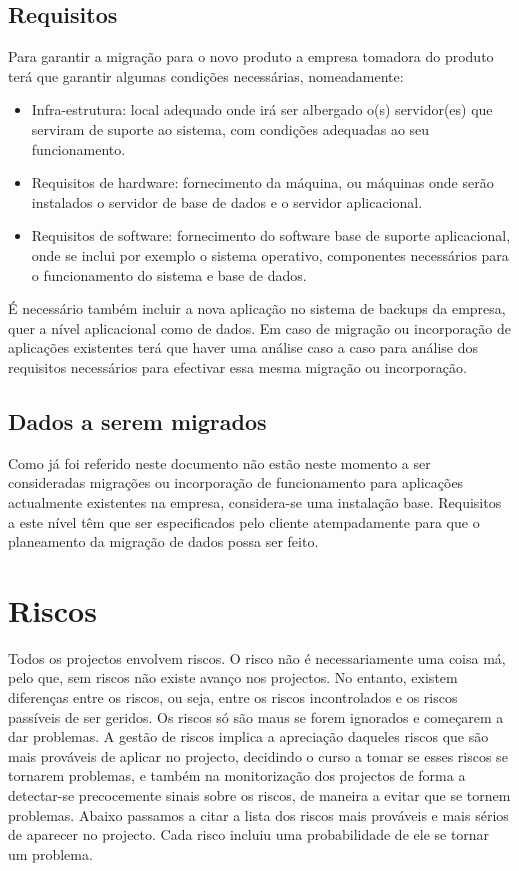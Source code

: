 \subsection{Requisitos}
Para garantir a migração para o novo produto a empresa tomadora do produto terá que garantir algumas condições necessárias, nomeadamente:

\begin{itemize} 
\item Infra-estrutura: local adequado onde irá ser albergado o(s) servidor(es) que serviram de suporte ao sistema, com condições adequadas ao seu funcionamento.
\item Requisitos de hardware: fornecimento da máquina, ou máquinas onde serão instalados o servidor de base de dados e o servidor aplicacional.
\item Requisitos de software: fornecimento do software base de suporte aplicacional, onde se inclui por exemplo o sistema operativo, componentes necessários para o funcionamento do sistema e base de dados.
\end{itemize}

É necessário também incluir a nova aplicação no sistema de backups da empresa, quer a nível aplicacional como de dados.
Em caso de migração ou incorporação de aplicações existentes terá que haver uma análise caso a caso para análise dos requisitos necessários para efectivar essa mesma migração ou incorporação.

\subsection{Dados a serem migrados}
Como já foi referido neste documento não estão neste momento a ser consideradas migrações ou incorporação de funcionamento para aplicações actualmente existentes na empresa, considera-se uma instalação base.
Requisitos a este nível têm que ser especificados pelo cliente atempadamente para que o planeamento da migração de dados possa ser feito.
 
\section{Riscos}
Todos os projectos envolvem riscos. O risco não é necessariamente uma coisa má, pelo que, sem riscos não existe avanço nos projectos. No entanto, existem diferenças entre os riscos, ou seja, entre os riscos incontrolados e os riscos passíveis de ser geridos. Os riscos só são maus se forem ignorados e começarem a dar problemas.
A gestão de riscos implica a apreciação daqueles riscos que são mais prováveis de aplicar no projecto, decidindo o curso a tomar se esses riscos se tornarem problemas, e também na monitorização dos projectos de forma a detectar-se precocemente sinais sobre os riscos, de maneira a evitar que se tornem problemas.
Abaixo passamos a citar a lista dos riscos mais prováveis e mais sérios de aparecer no projecto. Cada risco incluiu uma probabilidade de ele se tornar um problema.


